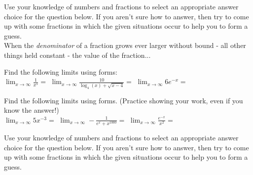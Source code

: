 \documentclass[10pt]{article}
\begin{document}
\lform   {} 
 Use your knowledge of numbers and fractions to select an appropriate answer choice for the question below. If you aren't sure how to answer, then try to come up with some fractions in which the given situations occur to help you to form a guess.\\

When the {\it denominator} of a fraction grows ever larger without bound - all other things held constant - the value of the fraction...\\
    


 Find the following limits using forms:\\

$\displaystyle\lim_{x\to\infty} \frac{1}{x^5}=$ 
\hfill 
$\displaystyle\lim_{x\to\infty} \frac{10}{\log_4(x)+\sqrt{x-4}}=$ 
\hfill $\displaystyle\lim_{x\to\infty} 6e^{-x}=$ 
\hfill

\vfill

 Find the following limits using forms. (Practice showing your work, even if you know the answer!)\\

$\displaystyle\lim_{x\to\infty} 5x^{-3}=$ 
\hfill 
$\displaystyle\lim_{x\to\infty} -\frac{1}{e^x+x^{1000}}=$ 
\hfill $\displaystyle\lim_{x\to\infty} \frac{e^{-x}}{x^2} =$ 
\hfill
\vfill
\newpage


\lform  {}


 Use your knowledge of numbers and fractions to select an appropriate answer choice for the question below. If you aren't sure how to answer, then try to come up with some fractions in which the given situations occur to help you to form a guess.\\
\end{document}
